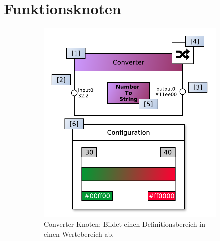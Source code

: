 \newpage
\section{Funktionsknoten}\label{anhang:funktionsknoten}
\begin{figure}[h]
\centering
\begin{subfigure}{.5\textwidth}
  \centering
  \includegraphics[width=1\linewidth]{bilder/Anhang/instanceconverterfunctionnode.pdf}
  \caption{Converter-Knoten: Bildet einen Definitionsbereich in einen Wertebereich ab.}
  \label{fig:actorgeneric}
\end{subfigure}%
\begin{subfigure}{.5\textwidth}
  \centering

\end{subfigure}
\end{figure}
